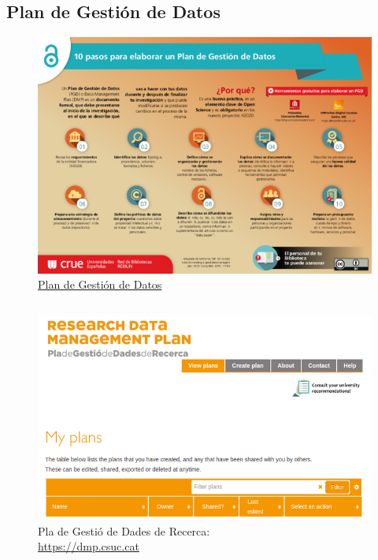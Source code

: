 \hypertarget{plan-gestion-datos}{%
\subsection{Plan de Gestión de Datos}\label{plan-gestion-datos}}

\begin{figure}
\centering
\includegraphics[width=6.77083in,height=\textheight]{imagenes-cuali/PlanDeDatos.png}
\caption{\href{http://rebiun.xercode.es/xmlui/bitstream/handle/20.500.11967/71/ES_IIIPE_Linea2_SubgOA_Info9_resolucionmedia_2016.jpg?sequence=8\&isAllowed=y}{Plan
de Gestión de Datos}}
\end{figure}

\hypertarget{dmp-csuc}{%
\subsection{}\label{dmp-csuc}}

\begin{figure}
\centering
\includegraphics{imagenes-cuali/DMP-CSUC.png}
\caption{Pla de Gestió de Dades de Recerca:\\
\href{https://dmp.csuc.cat/}{https://dmp.csuc.cat}}
\end{figure}

